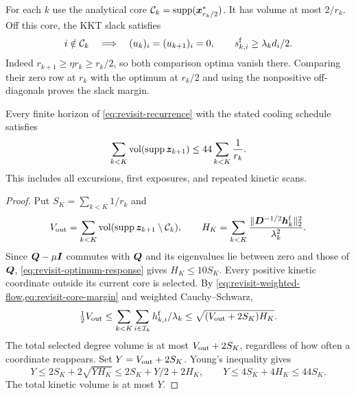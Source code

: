 For each $k$ use the analytical core
$\mathcal C_k=\operatorname{supp}(\bm{x}_{r_k/2}^*)$. It has volume at most $2/r_k$.
Off this core, the KKT slack satisfies
\begin{equation}
 i\notin\mathcal C_k\quad\Longrightarrow\quad
 (u_k)_i=(u_{k+1})_i=0,
 \qquad s_{k,i}^{\rm f}\geq\lambda_kd_i/2.
 \label{eq:revisit-core-margin}
\end{equation}
Indeed $r_{k+1}\geq\eta r_k\geq r_k/2$, so both comparison optima
vanish there. Comparing their zero row at $r_k$ with the optimum at
$r_k/2$ and using the nonpositive off-diagonals proves the slack margin.

\begin{theorem}
\label{thm:revisit-volume}
Every finite horizon of \cref{eq:revisit-recurrence} with the stated cooling
schedule satisfies
\begin{equation}
 \sum_{k<K}\operatorname{vol}(\operatorname{supp}\bm{z}_{k+1})
                  \leq44\sum_{k<K}\frac1{r_k}.
 \label{eq:revisit-volume}
\end{equation}
This includes all excursions, first exposures, and repeated kinetic scans.
\end{theorem}
\begin{proof}
Put $S_K=\sum_{k<K}1/r_k$ and
\[
 V_{\rm out}=\sum_{k<K}\operatorname{vol}(\operatorname{supp}\bm{z}_{k+1}\setminus\mathcal C_k),
 \qquad
 H_K=\sum_{k<K}
     \frac{\|\bm{D}^{-1/2}\bm{h}_k^{\rm f}\|_2^2}{\lambda_k^2}.
\]
Since $\bm{Q}-\mu\bm{I}$ commutes with $\bm{Q}$ and its eigenvalues lie between
zero and those of $\bm{Q}$, \cref{eq:revisit-optimum-response} gives
$H_K\leq10S_K$. Every positive kinetic coordinate outside its current
core is selected. By \cref{eq:revisit-weighted-flow,eq:revisit-core-margin}
and weighted Cauchy--Schwarz,
\[
 \tfrac12V_{\rm out}
 \leq\sum_{k<K}\sum_{i\in\mathcal I_k}h_{k,i}^{\rm f}/\lambda_k
 \leq\sqrt{(V_{\rm out}+2S_K)H_K}.
\]
The total selected degree volume is at most $V_{\rm out}+2S_K$,
regardless of how often a coordinate reappears. Set
$Y=V_{\rm out}+2S_K$. Young's inequality gives
\[
 Y\leq2S_K+2\sqrt{YH_K}
        \leq2S_K+Y/2+2H_K,
 \qquad Y\leq4S_K+4H_K\leq44S_K.
\]
The total kinetic volume is at most $Y$.
\end{proof}
